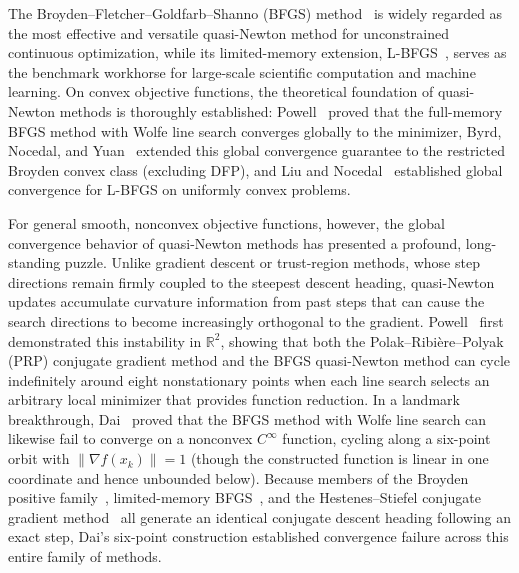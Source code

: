 \documentclass[11pt]{article}
\newcommand{\R}{\mathbb{R}}
\begin{document}
The Broyden--Fletcher--Goldfarb--Shanno (BFGS) method~\cite{broyden1970,nocedalwright2006} is widely regarded as the most effective and versatile quasi-Newton method for unconstrained continuous optimization, while its limited-memory extension, L-BFGS~\cite{liu1989}, serves as the benchmark workhorse for large-scale scientific computation and machine learning.
On convex objective functions, the theoretical foundation of quasi-Newton methods is thoroughly established: Powell~\cite{powell1976} proved that the full-memory BFGS method with Wolfe line search converges globally to the minimizer, Byrd, Nocedal, and Yuan~\cite{byrd1987} extended this global convergence guarantee to the restricted Broyden convex class (excluding DFP), and Liu and Nocedal~\cite{liu1989} established global convergence for L-BFGS on uniformly convex problems.

For general smooth, nonconvex objective functions, however, the global convergence behavior of quasi-Newton methods has presented a profound, long-standing puzzle.
Unlike gradient descent or trust-region methods, whose step directions remain firmly coupled to the steepest descent heading, quasi-Newton updates accumulate curvature information from past steps that can cause the search directions to become increasingly orthogonal to the gradient.
Powell~\cite{powell1984} first demonstrated this instability in $\R^2$, showing that both the Polak--Ribi\`ere--Polyak (PRP) conjugate gradient method and the BFGS quasi-Newton method can cycle indefinitely around eight nonstationary points when each line search selects an arbitrary local minimizer that provides function reduction.
In a landmark breakthrough, Dai~\cite{dai2002} proved that the BFGS method with Wolfe line search can likewise fail to converge on a nonconvex $C^\infty$ function, cycling along a six-point orbit with $\|\nabla f(x_k)\| = 1$ (though the constructed function is linear in one coordinate and hence unbounded below).
Because members of the Broyden positive family~\cite{broyden1970}, limited-memory BFGS~\cite{liu1989}, and the Hestenes--Stiefel conjugate gradient method~\cite{hestenes1952} all generate an identical conjugate descent heading following an exact step, Dai's six-point construction established convergence failure across this entire family of methods.
\end{document}
